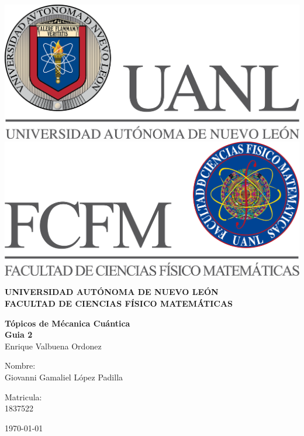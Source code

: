 \begin{titlepage}
    \begin{center}
    \includegraphics[scale=0.40]{../../Logos/uanl.png} 
    \hspace{2.5cm}
    \includegraphics[scale=0.40]{../../Logos/fcfm.png}
    \end{center}
    \vspace{2cm}
    \begin{center}
    \textbf{
    UNIVERSIDAD AUTÓNOMA DE NUEVO LEÓN\\
    FACULTAD DE CIENCIAS
        FÍSICO MATEMÁTICAS}\\
    \vspace*{2cm}
    \begin{large}
    \vspace{1cm}
    \large{\textbf{Tópicos de Mécanica Cuántica}}\\
    \textbf{Guia 2}\\
    Enrique Valbuena Ordonez\\
    \end{large}
    \vspace{3.5cm}
    \begin{minipage}{0.6\linewidth}
    \vspace{0.5cm}
    \changefontsizes{14pt}
    Nombre:\\
    Giovanni Gamaliel López Padilla\\
    \end{minipage}
    \begin{minipage}{0.2\linewidth}
    \changefontsizes{14pt}
    Matricula:\\
    1837522
    \end{minipage}
    \end{center}
    \vspace{4cm}
    \begin{flushright}
    \today
    \end{flushright}
    \end{titlepage}